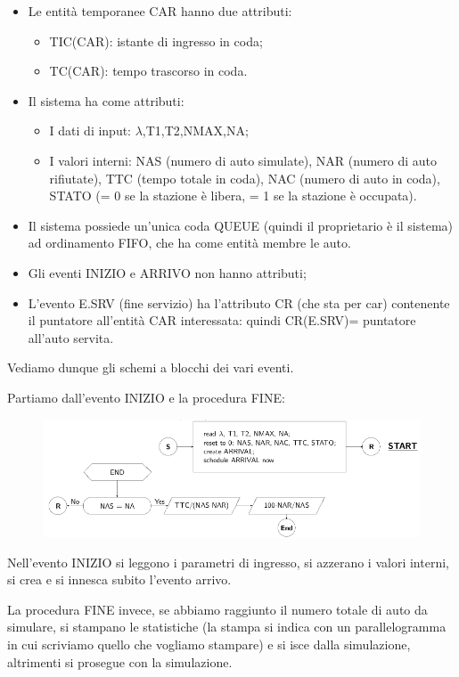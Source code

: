 \documentclass[11pt]{book}
\begin{document}
\begin{itemize}
\item Le entit\`a temporanee CAR hanno due attributi:
  \begin{itemize}
  \item TIC(CAR): istante di ingresso in coda;
  \item TC(CAR): tempo trascorso in coda.
  \end{itemize}
\item Il sistema ha come attributi:
  \begin{itemize}
  \item I dati di input: $\lambda$,T1,T2,NMAX,NA;
  \item I valori interni: NAS (numero di auto simulate), NAR (numero
    di auto rifiutate), TTC (tempo totale in coda), NAC (numero di
    auto in coda), STATO (= 0 se la stazione \`e libera, = 1 se la
    stazione \`e occupata).
  \end{itemize}
\item Il sistema possiede un'unica coda QUEUE (quindi il proprietario
  \`e il sistema) ad ordinamento FIFO, che ha come entit\`a membre le
  auto.
\item Gli eventi INIZIO e ARRIVO non hanno attributi;
\item L'evento E.SRV (fine servizio) ha l'attributo CR (che sta per
  car) contenente il puntatore all'entit\`a CAR interessata: quindi
  CR(E.SRV)= puntatore all'auto servita.
\end{itemize}

Vediamo dunque gli schemi a blocchi dei vari eventi.

Partiamo dall'evento INIZIO e la procedura FINE:

\begin{figure}[H]
  \centering
  \includegraphics[width=\textwidth]{images/cap11fig37.png}
\end{figure}

Nell'evento INIZIO si leggono i parametri di ingresso, si azzerano i
valori interni, si crea e si innesca subito l'evento arrivo.

La procedura FINE invece, se abbiamo raggiunto il numero totale di
auto da simulare, si stampano le statistiche (la stampa si indica con
un parallelogramma in cui scriviamo quello che vogliamo stampare) e si
isce dalla simulazione, altrimenti si prosegue con la simulazione.
\end{document}
